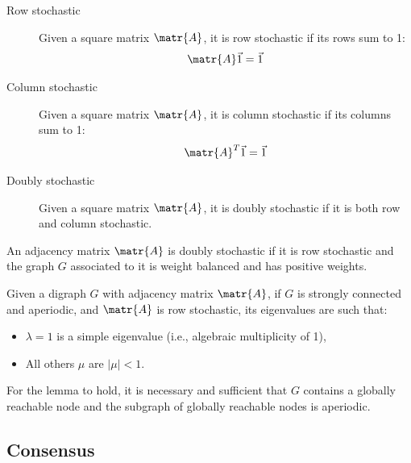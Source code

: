 \begin{description}
    \item[Row stochastic] 
        Given a square matrix $\matr{A}$, it is row stochastic if its rows sum to 1:
        \[ \matr{A}\vec{1} = \vec{1} \]

    \item[Column stochastic] 
        Given a square matrix $\matr{A}$, it is column stochastic if its columns sum to 1:
        \[ \matr{A}^T\vec{1} = \vec{1} \]

    \item[Doubly stochastic] 
        Given a square matrix $\matr{A}$, it is doubly stochastic if it is both row and column stochastic.
\end{description}

\begin{lemma}
    An adjacency matrix $\matr{A}$ is doubly stochastic if it is row stochastic and the graph $G$ associated to it is weight balanced and has positive weights.
\end{lemma}

\begin{lemma} \label{th:strongly_connected_eigenvalues}
    Given a digraph $G$ with adjacency matrix $\matr{A}$, if $G$ is strongly connected and aperiodic, and $\matr{A}$ is row stochastic, its eigenvalues are such that:
    \begin{itemize}
        \item $\lambda = 1$ is a simple eigenvalue (i.e., algebraic multiplicity of 1),
        \item All others $\mu$ are $|\mu| < 1$.
    \end{itemize}

    \indenttbox
    \begin{remark}
        For the lemma to hold, it is necessary and sufficient that $G$ contains a globally reachable node and the subgraph of globally reachable nodes is aperiodic.
    \end{remark}
\end{lemma}


\subsection{Consensus}


